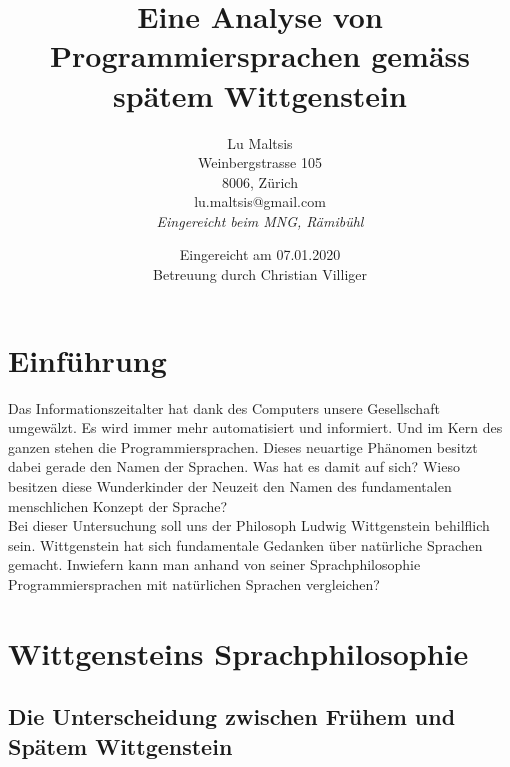 \documentclass[10pt,a4paper]{article}
\begin{document}
\title{\Large{\textbf{Eine Analyse von Programmiersprachen gemäss spätem Wittgenstein}}}
\author{Lu Maltsis \\
Weinbergstrasse 105 \\
8006, Zürich \\
lu.maltsis@gmail.com \\
\textit{Eingereicht beim MNG, Rämibühl}
}
\date{Eingereicht am 07.01.2020 \\
\vspace{10mm}
Betreuung durch Christian Villiger}
\maketitle
\newpage

\setcounter{section}{-1}
\tableofcontents{}

\section{Einführung}
Das Informationszeitalter hat dank des Computers unsere Gesellschaft umgewälzt. Es wird immer mehr automatisiert und informiert. Und im Kern des ganzen stehen die Programmiersprachen. Dieses neuartige Phänomen besitzt dabei gerade den Namen der Sprachen. Was hat es damit auf sich? Wieso besitzen diese Wunderkinder der Neuzeit den Namen des fundamentalen menschlichen Konzept der Sprache? \\
Bei dieser Untersuchung soll uns der Philosoph Ludwig Wittgenstein behilflich sein. Wittgenstein hat sich fundamentale Gedanken über natürliche Sprachen gemacht. Inwiefern kann man anhand von seiner Sprachphilosophie Programmiersprachen mit natürlichen Sprachen vergleichen?


\section{Wittgensteins Sprachphilosophie}

\subsection{Die Unterscheidung zwischen Frühem und Spätem Wittgenstein}
\end{document}
